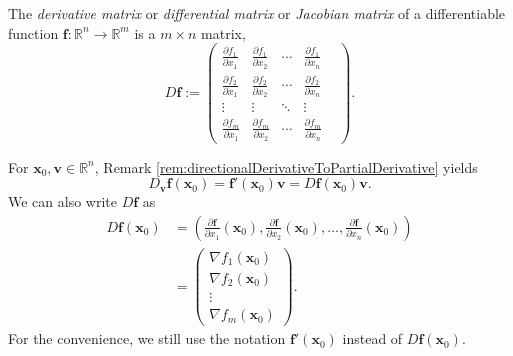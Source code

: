 \begin{defn}
  The \emph{derivative matrix} or \emph{differential matrix}
  or \emph{Jacobian matrix} of a differentiable function
  \mbox{$\mathbf{f}: \mathbb{R}^n\rightarrow\mathbb{R}^m$}
  is a $m\times n$ matrix,
  \begin{equation}
    \label{eq:JacobianMatrix}
    D\mathbf{f} :=
    \begin{pmatrix}
      \frac{\partial f_1}{\partial x_1}
      &
      \frac{\partial f_1}{\partial x_2}
      & \cdots &
      \frac{\partial f_1}{\partial x_n}
      \\
      \frac{\partial f_2}{\partial x_1}
      &
      \frac{\partial f_2}{\partial x_2}
      & \cdots &
      \frac{\partial f_2}{\partial x_n}
      \\
      \vdots & \vdots & \ddots & \vdots &
      \\
      \frac{\partial f_m}{\partial x_1}
      &
      \frac{\partial f_m}{\partial x_2}
      & \cdots &
      \frac{\partial f_m}{\partial x_n}
    \end{pmatrix}.
  \end{equation}
\end{defn}

\begin{rem}
  For $\mathbf{x}_{0},\mathbf{v}\in \mathbb{R}^{n}$,
  Remark \ref{rem:directionalDerivativeToPartialDerivative} yields
  \begin{displaymath}
    D_{\mathbf{v}}\mathbf{f}(\mathbf{x}_{0})
    =\mathbf{f}'(\mathbf{x}_{0})\mathbf{v}
    =D\mathbf{f}(\mathbf{x}_{0})\mathbf{v}.
  \end{displaymath}
  We can also write $D \mathbf{f}$ as
  \begin{align*}
    D\mathbf{f}(\mathbf{x}_0) &= \left(
      \frac{\partial \mathbf{f}}{\partial x_1}(\mathbf{x}_{0}),
      \frac{\partial \mathbf{f}}{\partial x_2}(\mathbf{x}_{0}),
      \ldots, 
      \frac{\partial \mathbf{f}}{\partial x_n}(\mathbf{x}_{0})\right)
    \\
    &=
      \begin{pmatrix}
        \nabla f_1(\mathbf{x}_0)
        \\
        \nabla f_2(\mathbf{x}_0)
        \\
        \vdots
        \\
        \nabla f_m(\mathbf{x}_0)
      \end{pmatrix}.
  \end{align*}
  For the convenience, we still use the notation
  $\mathbf{f}'(\mathbf{x}_{0})$ instead of $D\mathbf{f}(\mathbf{x}_{0})$.
\end{rem}

